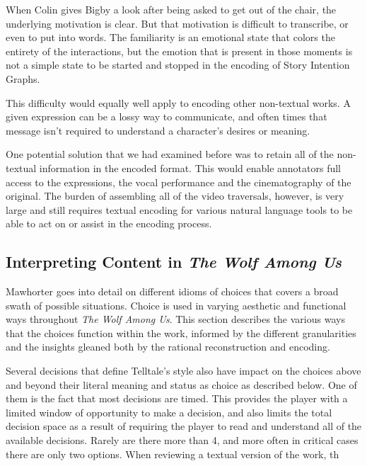 When Colin gives Bigby a look after being asked to get out of the
chair, the underlying motivation is clear. But that motivation is
difficult to transcribe, or even to put into words. The familiarity is
an emotional state that colors the entirety of the interactions, but
the emotion that is present in those moments is not a simple state to
be started and stopped in the encoding of Story Intention Graphs.

This difficulty would equally well apply to encoding other non-textual
works. A given expression can be a lossy way to communicate, and often
times that message isn't required to understand a character's desires
or meaning. 

One potential solution that we had examined before was to retain all
of the non-textual information in the encoded format. This would
enable annotators full access to the expressions, the vocal
performance and the cinematography of the original. The burden of
assembling all of the video traversals, however, is very large and
still requires textual encoding for various natural language tools to
be able to act on or assist in the encoding process.

\subsection{Interpreting Content in \emph{The Wolf Among Us}}
\label{sec:orgheadline12}
Mawhorter goes into detail on different idioms of choices that covers
a broad swath of possible situations. Choice is used in varying
aesthetic and functional ways throughout \emph{The Wolf Among Us}. This
section describes the various ways that the choices function within
the work, informed by the different granularities and the insights
gleaned both by the rational reconstruction and encoding. 

Several decisions that define Telltale's style also have impact on the
choices above and beyond their literal meaning and status as choice as
described below. One of them is the fact that most decisions are
timed. This provides the player with a limited window of opportunity
to make a decision, and also limits the total decision space as a
result of requiring the player to read and understand all of the
available decisions. Rarely are there more than 4, and more often in
critical cases there are only two options. When reviewing a textual version of the work, th

